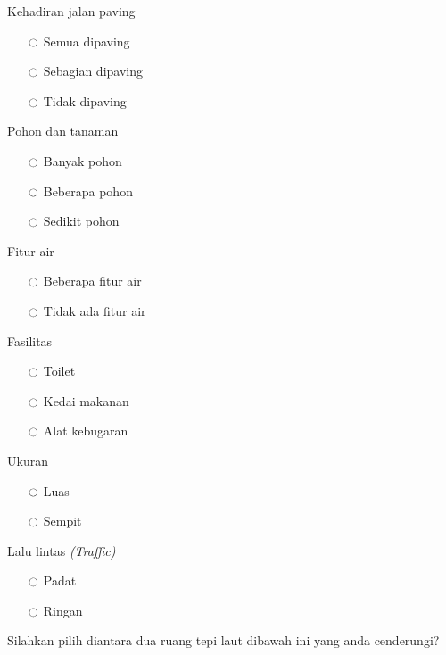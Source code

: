\begin{multicols}{2}
Kehadiran jalan paving
\begin{itemize}
\item[$\ocircle$] Semua dipaving
\item[$\ocircle$] Sebagian dipaving
\item[$\ocircle$] Tidak dipaving
\end{itemize}

Pohon dan tanaman
\begin{itemize}
\item[$\ocircle$] Banyak pohon
\item[$\ocircle$] Beberapa pohon
\item[$\ocircle$] Sedikit pohon
\end{itemize}

Fitur air
\begin{itemize}
\item[$\ocircle$] Beberapa fitur air
\item[$\ocircle$] Tidak ada fitur air
\end{itemize}

Fasilitas
\begin{itemize}
\item[$\ocircle$] Toilet
\item[$\ocircle$] Kedai makanan
\item[$\ocircle$] Alat kebugaran
\end{itemize}

Ukuran
\begin{itemize}
\item[$\ocircle$] Luas
\item[$\ocircle$] Sempit
\end{itemize}


Lalu lintas \textit{(Traffic)}
\begin{itemize}
\item[$\ocircle$] Padat
\item[$\ocircle$] Ringan
\end{itemize}

\end{multicols}


Silahkan pilih diantara dua ruang tepi laut dibawah ini yang anda cenderungi?

